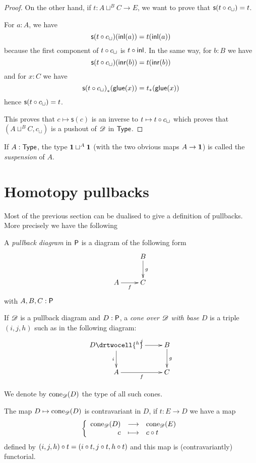 \begin{proof}
On the other hand, if $t:A\sqcup^BC\to{}E$, we want to prove that
$\mathsf{s}(\composecocone{t}c_\sqcup)=t$.

For $a:A$, we have
\[\mathsf{s}(\composecocone{t}c_\sqcup)(\inl(a))=t(\inl(a))\]
because the first component of $\composecocone{t}c_\sqcup$ is $t\circ\inl$. In
the same way, for $b:B$ we have
\[\mathsf{s}(\composecocone{t}c_\sqcup)(\inr(b))=t(\inr(b))\]
and for $x:C$ we have
\[\mapfunc{\mathsf{s}(\composecocone{t}c_\sqcup)}(\glue(x))
=\mapfunc{t}(\glue(x))\]
hence $\mathsf{s}(\composecocone{t}c_\sqcup)=t$.

This proves that $c\mapsto\mathsf{s}(c)$ is an inverse to
$t\mapsto{}\composecocone{t}c_\sqcup$ which proves that
$(A\sqcup^BC,c_\sqcup)$ is a pushout of $\Ddiag$ in $\type$.
\end{proof}

\begin{defn}
  If $A:\type$, the type $\unit\sqcup^A\unit$ (with the two obvious maps
  $A\to\unit$) is called the \emph{suspension} of $A$.
\end{defn}

\section{Homotopy pullbacks}
\label{sec:pullbacks}

Most of the previous section can be dualised to give a definition of
pullbacks. More precisely we have the following

\begin{defn}
  A \emph{pullback diagram} in $\P$ is a diagram of the following form
  \[\xymatrix{& B \ar^g[d] \\ A \ar_f[r] & C}\]
  with $A,B,C:\P$
\end{defn}

\begin{defn}
  If $\Ddiag$ is a pullback diagram and $D:\P$, a \emph{cone over $\Ddiag$ with
    base $D$} is a triple $(i,j,h)$ such as in the following diagram:
  \[\uppercurveobject{{ }}\lowercurveobject{{ }}\twocellhead{{ }}
  \xymatrix{D \ar^j[r] \ar_i[d] \drtwocell{^h} & B \ar^g[d] \\
    A \ar_f[r] & C
  }\]

  We denote by $\cone{\Ddiag}{D}$ the type of all such cones.
\end{defn}

The map $D\mapsto\cone{\Ddiag}{D}$ is contravariant in $D$, if $t:E\to{}D$ we
have a map
\[\function{\cone{\Ddiag}{D}}{\cone{\Ddiag}{E}}{c}{\composecone{t}{c}}\]
defined by $\composecone{t}{(i,j,h)}=(i\circ{}t,j\circ{}t,h\circ{}t)$ and this
map is (contravariantly) functorial.

